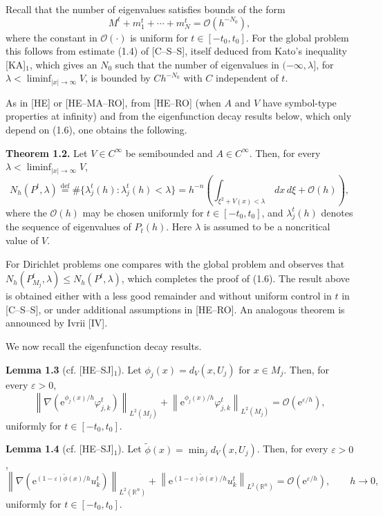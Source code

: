 \documentclass[11pt]{article}
\newcommand{\R}{\mathbb{R}}
\newcommand{\OO}{\mathcal O}
\newcommand{\dd}{\,d}
\newcommand{\e}{\mathrm{e}}
\begin{document}
Recall that the number of eigenvalues satisfies bounds of the form
\begin{equation}
M^t+m_1^t+\cdots+m_N^t=\OO(h^{-N_0}),
\tag{1.6}
\end{equation}
where the constant in $\OO(\cdot)$ is uniform for $t\in[-t_0,t_0]$.
For the global problem this follows from estimate (1.4) of [C--S--S], itself deduced from Kato's inequality [KA]$_1$, which gives an $N_0$ such that the number of eigenvalues in $(-\infty,\lambda]$, for $\lambda<\liminf_{|x|\to\infty}V$, is bounded by $Ch^{-N_0}$ with $C$ independent of $t$.

As in [HE] or [HE--MA--RO], from [HE--RO] (when $A$ and $V$ have symbol-type properties at infinity) and from the eigenfunction decay results below, which only depend on (1.6), one obtains the following.

\medskip
\noindent\textbf{Theorem 1.2.}
Let $V\in C^\infty$ be semibounded and $A\in C^\infty$. Then, for every
$\lambda<\liminf_{|x|\to\infty}V$,
\[
N_h(P^t,\lambda)\stackrel{\mathrm{def}}{=}
\#\{\lambda_j^t(h):\lambda_j^t(h)<\lambda\}
=h^{-n}\left(\int_{\xi^2+V(x)<\lambda}\dd x\dd\xi+\OO(h)\right),
\]
where the $\OO(h)$ may be chosen uniformly for $t\in[-t_0,t_0]$, and $\lambda_j^t(h)$ denotes the sequence of eigenvalues of $P_t(h)$. Here $\lambda$ is assumed to be a noncritical value of $V$.

For Dirichlet problems one compares with the global problem and observes that $N_h(P^t_{M_j},\lambda)\le N_h(P^t,\lambda)$, which completes the proof of (1.6).
The result above is obtained either with a less good remainder and without uniform control in $t$ in [C--S--S], or under additional assumptions in [HE--RO]. An analogous theorem is announced by Ivrii [IV].

We now recall the eigenfunction decay results.

\medskip
\noindent\textbf{Lemma 1.3} (cf. [HE--SJ]$_1$).
Let $\phi_j(x)=d_V(x,U_j)$ for $x\in M_j$. Then, for every $\varepsilon>0$,
\begin{equation}
\left\|\nabla\!\left(\e^{\phi_j(x)/h}\varphi_{j,k}^t\right)\right\|_{L^2(M_j)}
+\left\|\e^{\phi_j(x)/h}\varphi_{j,k}^t\right\|_{L^2(M_j)}
=\OO(\e^{\varepsilon/h}),
\tag{1.7}
\end{equation}
uniformly for $t\in[-t_0,t_0]$.

\medskip
\noindent\textbf{Lemma 1.4} (cf. [HE--SJ]$_1$).
Let $\widetilde\phi(x)=\min_j d_V(x,U_j)$. Then, for every $\varepsilon>0$,
\begin{equation}
\left\|\nabla\!\left(\e^{(1-\varepsilon)\widetilde\phi(x)/h}u_k^t\right)\right\|_{L^2(\R^n)}
+\left\|\e^{(1-\varepsilon)\widetilde\phi(x)/h}u_k^t\right\|_{L^2(\R^n)}
=\OO(\e^{\varepsilon/h}),\qquad h\to0,
\tag{1.8}
\end{equation}
uniformly for $t\in[-t_0,t_0]$.
\end{document}
